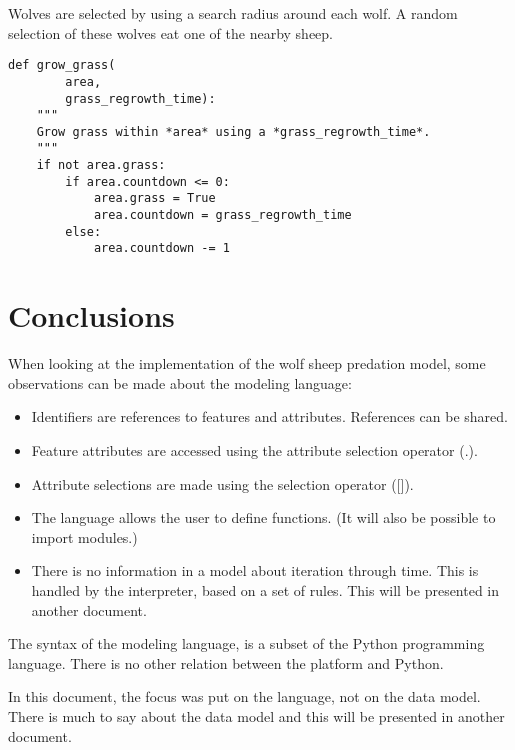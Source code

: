 \documentclass[10pt, a4paper]{article}
\begin{document}
Wolves are selected by using a search radius around each wolf. A random selection of these wolves eat one of the nearby sheep.

\begin{lstlisting}
def grow_grass(
        area,
        grass_regrowth_time):
    """
    Grow grass within *area* using a *grass_regrowth_time*.
    """
    if not area.grass:
        if area.countdown <= 0:
            area.grass = True
            area.countdown = grass_regrowth_time
        else:
            area.countdown -= 1
\end{lstlisting}

% 

\section{Conclusions}

When looking at the implementation of the wolf sheep predation model, some observations can be made about the modeling language:

\begin{itemize}
    \item Identifiers are references to features and attributes. References can be shared.
    \item Feature attributes are accessed using the attribute selection operator (.).
    \item Attribute selections are made using the selection operator ([]).
    \item The language allows the user to define functions. (It will also be possible to import modules.)
    \item There is no information in a model about iteration through time. This is handled by the interpreter, based on a set of rules. This will be presented in another document.
\end{itemize}

The syntax of the modeling language, is a subset of the Python programming language. There is no other relation between the platform and Python.

In this document, the focus was put on the language, not on the data model. There is much to say about the data model and this will be presented in another document.
\end{document}

